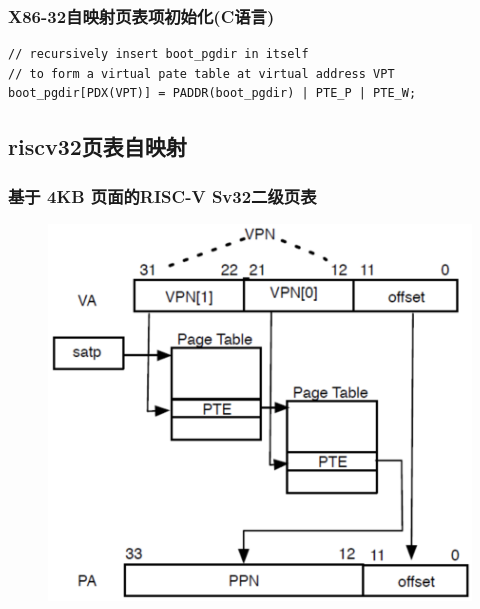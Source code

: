 % 
\begin{frame}
    \frametitle{X86-32自映射页表项初始化(C语言)}
    \begin{block}{}
    \begin{verbatim}
// recursively insert boot_pgdir in itself
// to form a virtual pate table at virtual address VPT
boot_pgdir[PDX(VPT)] = PADDR(boot_pgdir) | PTE_P | PTE_W;
    \end{verbatim}
    \end{block}
\end{frame}
\subsection{riscv32页表自映射} %
\begin{frame}
    \frametitle{基于 4KB 页面的RISC-V Sv32二级页表}
    \begin{figure}
    \includegraphics[width=0.5\linewidth]{figs/riscv32-pagetable.png}
    \end{figure}
\end{frame}

